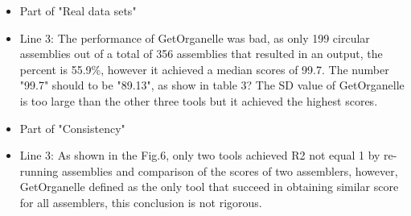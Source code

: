 \documentclass[a4paper,10pt]{scrartcl}
\begin{document}
\begin{itemize}
    \item Part of "Real data sets"
    \item Line 3: The performance of GetOrganelle was bad, as only 199 circular assemblies out of a total of 356 assemblies that resulted in an output, the percent is 55.9\%, however it achieved a median scores of 99.7. The number "99.7" should to be "89.13", as show in table 3? The SD value of GetOrganelle is too large than the other three tools but it achieved the highest scores.
    \item Part of "Consistency"
    \item Line 3: As shown in the Fig.6, only two tools achieved R2  not equal 1 by re-running assemblies and comparison of the scores of two assemblers, however, GetOrganelle defined as the only tool that succeed in obtaining similar score for all assemblers, this conclusion is not rigorous.
\end{itemize}
\end{document}
